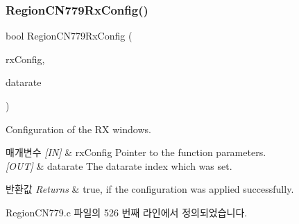 \subsubsection{\texorpdfstring{Region\+C\+N779\+Rx\+Config()}{RegionCN779RxConfig()}}
{\footnotesize\ttfamily bool Region\+C\+N779\+Rx\+Config (\begin{DoxyParamCaption}\item[{\mbox{\hyperlink{group___r_e_g_i_o_n_ga375c038078dfcfc7ef14280021db719e}{Rx\+Config\+Params\+\_\+t}} $\ast$}]{rx\+Config,  }\item[{int8\+\_\+t $\ast$}]{datarate }\end{DoxyParamCaption})}



Configuration of the RX windows. 


\begin{DoxyParams}{매개변수}
{\em \mbox{[}\+I\+N\mbox{]}} & rx\+Config Pointer to the function parameters.\\
\hline
{\em \mbox{[}\+O\+U\+T\mbox{]}} & datarate The datarate index which was set.\\
\hline
\end{DoxyParams}

\begin{DoxyRetVals}{반환값}
{\em Returns} & true, if the configuration was applied successfully. \\
\hline
\end{DoxyRetVals}


Region\+C\+N779.\+c 파일의 526 번째 라인에서 정의되었습니다.


